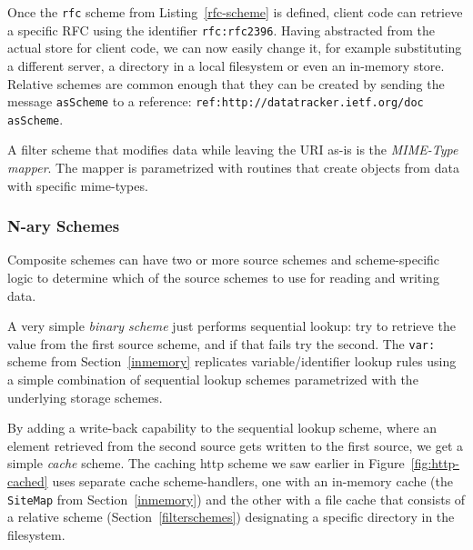\documentclass[preprint]{sigplanconf}
\begin{document}
Once the {\tt rfc} scheme from Listing~\ref{rfc-scheme} is defined, client code can 
retrieve a specific RFC using the identifier {\tt  rfc:rfc2396}.  Having abstracted
from the actual store for client code, we can now easily change it, for example
substituting a different server, a directory in a local filesystem or even an 
in-memory store.  Relative schemes are common enough that they can be
created by sending the message {\tt asScheme} to a reference: {\tt ref:http://datatracker.ietf.org/doc asScheme}.




A filter scheme that modifies data while leaving the URI as-is is the \emph{MIME-Type mapper}.
The mapper is parametrized with routines that create objects from data with specific
mime-types.  


\subsubsection{N-ary Schemes}

Composite schemes can have two or more source schemes and scheme-specific logic
to determine which of the source schemes to use for reading and writing data.

A very simple \emph{binary scheme} just performs sequential lookup:  try to
retrieve the value from the first source scheme, and if that fails try the second.
The {\tt var:} scheme from Section~\ref{inmemory}  replicates variable/identifier
lookup rules using a simple combination of sequential lookup schemes parametrized
with the underlying storage schemes.

By adding a write-back capability to the sequential lookup scheme, where an element
retrieved from the second source gets written to the first source, we get a simple \emph{cache} scheme.  
The caching http scheme we saw earlier in Figure~\ref{fig:http-cached} uses
separate cache scheme-handlers, one with an in-memory cache (the {\tt SiteMap} from Section~\ref{inmemory})
and the other with a file cache that consists of a relative scheme (Section~\ref{filterschemes}) 
designating a specific directory in the filesystem.
\end{document}
